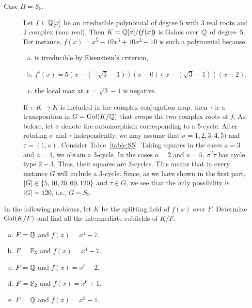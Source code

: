 \begin{solution}
\begin{description}
        \item[Case $H=S_5$.] Let $f\in\mathbb{Q}[x]$ be an irreducible polynomial of degree $5$ with $3$ real roots and $2$ complex (non real). Then $K=\mathbb{Q}[x]/\textrm{\boldmath$($}\!f(x)\!\textrm{\boldmath$)$}$ is Galois over~$\mathbb{Q}$ of degree~$5$. For instance, $f(x)=x^5-10x^3+10x^2-10$ is such a polynomial because
        \begin{enumerate}[a), font=\upshape]
            \item is irreducible by Eisenstein's criterion,
            \item $f'(x)=5(x-(-\sqrt3-1))(x-0)(x-(\sqrt3-1))(x-2)$,
            \item the local max at $x=\sqrt3-1$ is negative.
        \end{enumerate}
        If $\tau\colon K\to K$ is included in the complex conjugation map, then $\tau$ is a transposition in $G=\operatorname{Gal}(K/\mathbb{Q})$ that swaps the two complex roots of $f$. As before, let $\sigma$ denote the automorphism corresponding to a $5$-cycle. After rotating $\sigma$ and $\tau$ independently, we may assume that $\sigma=1,2,3,4,5)$ and $\tau=(1,a)$. Consider Table~\ref{table:S5}. Taking squares in the cases $a=3$ and $a=4$, we obtain a $3$-cycle. In the cases $a=2$ and $a=5$, $\sigma^2\tau$ has cycle type $2-3$. Thus, their squares are $3$-cycles. This means that in every instance $G$ will include a $3$-cycle. Since, as we have shown in the first part, $|G|\in\{5,10,20,60,120\}$ and $\tau\in G$, we see that the only possibility is $|G|=120$, i.e., $G=S_5$.
    \end{description}
\end{solution}

\begin{probl}
    In the following problems, let\/ $K$ be the splitting field of\/ $f(x)$ over\/ $F$. 
    Determine\/ $\operatorname{Gal}(K/F)$ and find all the intermediate subfields of\/ $K/F$.
    \begin{enumerate}[a), font=\upshape]
        \item $F = \mathbb{Q}$ and\/ $f(x) = x^4 - 7$.
        \item $F = \mathbb F_5$ and\/ $f(x) = x^4 - 7$.
        \item $F = \mathbb{Q}$ and\/ $f(x) = x^5 - 2$.
        \item $F = \mathbb F_2$ and\/ $f(x) = x^6 + 1$.
        \item $F = \mathbb{Q}$ and\/ $f(x) = x^8 - 1$.
    \end{enumerate}
\end{probl}

